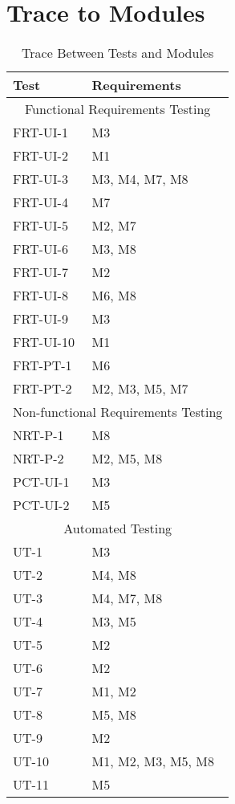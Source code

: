 \documentclass[12pt, titlepage]{article}
\begin{document}
\section{Trace to Modules}		
\label{trace:module}
\begin{table}[H]
			\begin{tabularx}{\textwidth}{XX}
				\toprule
				Test & Requirements \\
				\midrule
				\multicolumn{2}{c}{Functional Requirements Testing} \\
				\midrule
				FRT-UI-1 & M3 \\
				FRT-UI-2 & M1 \\
				FRT-UI-3 & M3, M4, M7, M8 \\
				FRT-UI-4 & M7 \\
				FRT-UI-5 & M2, M7 \\
				FRT-UI-6 & M3, M8 \\
				FRT-UI-7 & M2 \\
				FRT-UI-8 & M6, M8 \\
				FRT-UI-9 & M3 \\
				FRT-UI-10 & M1 \\
				FRT-PT-1 & M6 \\
				FRT-PT-2 & M2, M3, M5, M7 \\
				\midrule
				\multicolumn{2}{c}{Non-functional Requirements Testing} \\
				\midrule
				NRT-P-1 & M8 \\
				NRT-P-2 & M2, M5, M8 \\
				PCT-UI-1 & M3 \\
				PCT-UI-2 & M5 \\
				\midrule
				\multicolumn{2}{c}{Automated Testing} \\
				\midrule
				UT-1 & M3 \\
				UT-2 & M4, M8 \\
				UT-3 & M4, M7, M8 \\
				UT-4 & M3, M5 \\
				UT-5 & M2 \\
				UT-6 & M2 \\
				UT-7 & M1, M2 \\
				UT-8 & M5, M8 \\
				UT-9 & M2 \\
				UT-10 & M1, M2, M3, M5, M8 \\
				UT-11 & M5 \\
				\bottomrule
			\end{tabularx}

			\caption{Trace Between Tests and Modules}
			\label{Table}
		\end{table}
		
\end{document}
